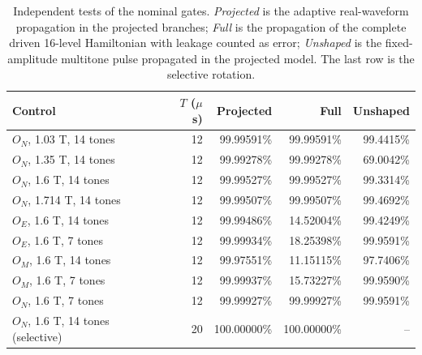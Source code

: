 \begin{table}[htbp]
\centering
\small
\setlength{\tabcolsep}{4pt}
\caption{Independent tests of the nominal gates. \emph{Projected} is the adaptive real-waveform propagation in the projected branches; \emph{Full} is the propagation of the complete driven 16-level Hamiltonian with leakage counted as error; \emph{Unshaped} is the fixed-amplitude multitone pulse propagated in the projected model. The last row is the selective rotation.}\label{tab:nominal}
\begin{tabular}{lrrrr}
\toprule
Control & $T$ ($\mu$s) & Projected & Full & Unshaped \\
\midrule
$O_N$, 1.03 T, 14 tones & 12 & 99.99591\% & 99.99591\% & 99.4415\% \\
$O_N$, 1.35 T, 14 tones & 12 & 99.99278\% & 99.99278\% & 69.0042\% \\
$O_N$, 1.6 T, 14 tones & 12 & 99.99527\% & 99.99527\% & 99.3314\% \\
$O_N$, 1.714 T, 14 tones & 12 & 99.99507\% & 99.99507\% & 99.4692\% \\
$O_E$, 1.6 T, 14 tones & 12 & 99.99486\% & 14.52004\% & 99.4249\% \\
$O_E$, 1.6 T, 7 tones & 12 & 99.99934\% & 18.25398\% & 99.9591\% \\
$O_M$, 1.6 T, 14 tones & 12 & 99.97551\% & 11.15115\% & 97.7406\% \\
$O_M$, 1.6 T, 7 tones & 12 & 99.99937\% & 15.73227\% & 99.9590\% \\
$O_N$, 1.6 T, 7 tones & 12 & 99.99927\% & 99.99927\% & 99.9591\% \\
$O_N$, 1.6 T, 14 tones (selective) & 20 & 100.00000\% & 100.00000\% & -- \\
\bottomrule
\end{tabular}
\end{table}
